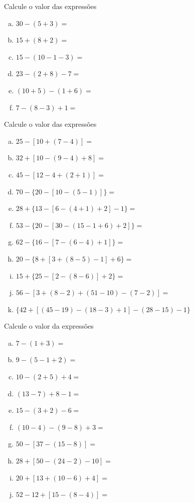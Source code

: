 	\item Calcule o valor das expressões
	\begin{multicols}{2}
	\begin{enumerate}[a)]
		\item $30-(5+3) = $
		\item $15+(8+2) =$
		\item $15-(10-1-3) =$
		\item $23-(2+8)-7 = $
		\item $(10+5)-(1+6) =$
		\item $ 7-(8-3)+1=$
	\end{enumerate}
	\end{multicols}
	\item Calcule o valor das expressões
	\begin{multicols}{2}
	\begin{enumerate}[a)]
		\item $25-[10+(7-4)] =$
		\item $32+[10-(9-4)+8] =$
		\item $45-[12-4+(2+1)] =$
		\item $70-\{20-[10-(5-1)]\} =$
		\item $28+\{13-[6-(4+1)+2]-1\} =$
		\item $53-\{20-[30-(15-1+6)+2]\} =$
		\item $62-\{16-[7-(6-4)+1]\} =$
		\item $20-\{8+[3+(8-5)-1]+6\} =$
		\item $15+\{25-[2-(8-6)]+2\} =$
		\item $56-[3+(8-2)+(51-10)-(7-2)] =$
		\item $\{42+[(45-19)-(18-3)+1]-(28-15)-1\} $
	\end{enumerate}
	\end{multicols}
	\item Calcule o valor da expressões
	\begin{multicols}{2}
	\begin{enumerate}[a)]
		\item $7-(1+3)=$
		\item $9-(5-1+2)=$
		\item $10-(2+5)+4=$
		\item $(13-7)+8-1=$
		\item $15-(3+2)-6=$
		\item $(10-4)-(9-8)+3=$
		\item $50-[37-(15-8)]=$
		\item $28+[50-(24-2)-10]=$
		\item $20+[13+(10-6)+4]=$
		\item $52-{12+[15-(8-4)]}=$
	\end{enumerate}
	\end{multicols}

